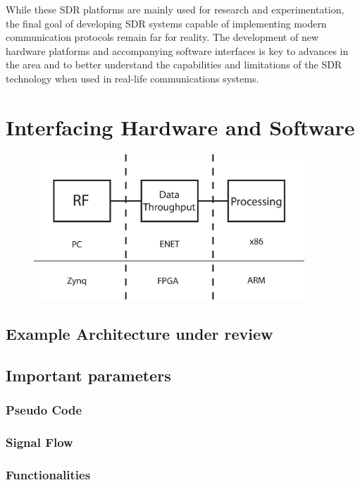 \documentclass{article}
\begin{document}
While these SDR platforms are mainly used for research and experimentation, the final goal of developing SDR systems capable of implementing modern communication protocols remain far for reality. The development of new hardware platforms and accompanying software interfaces is key to advances in the area and to better understand the capabilities and limitations of the SDR technology when used in real-life communications systems.  



\section{Interfacing Hardware and Software}

\begin{figure}[h]
\centering
{\includegraphics[width=4.0in]{Figures/architecture}}
\caption{}
\label{fig_arch}
\end{figure}

\subsection{Example Architecture under review}
\subsection{Important parameters}

\subsubsection{Pseudo Code}
\subsubsection{Signal Flow}
\subsubsection{Functionalities}
\end{document}
